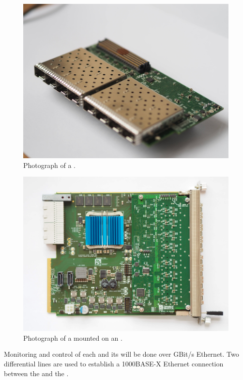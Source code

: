 \documentclass[main.tex]{subfiles}
\begin{document}
\begin{figure}[h]
\includegraphics[width=\textwidth]{P7230005.jpg}
\caption{Photograph of a .}
\label{fig:fib_photo}
\end{figure}

\begin{figure}[h]
\includegraphics[width=\textwidth]{OI000293.jpg}
\caption{Photograph of a  mounted on an .}
\label{fig:fib_afc_photo}
\end{figure}

Monitoring and control of each  and its  will be done over GBit/s Ethernet. Two differential lines are used to establish a 1000BASE-X Ethernet connection between the  and the .
\end{document}
